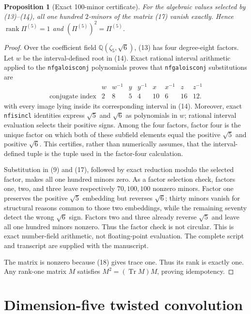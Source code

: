\documentclass[11pt]{article}
\newtheorem{proposition}[theorem]{Proposition}
\newcommand{\Tr}{\operatorname{Tr}}
\newcommand{\Q}{\mathbb Q}
\begin{document}
\begin{proposition}[Exact 100-minor certificate]\label{prop:minors}
For the algebraic values selected by (13)--(14), all one hundred
$2$-minors of the matrix (17) vanish exactly.  Hence
$\operatorname{rank}\Pi^{(5)}=1$ and
$(\Pi^{(5)})^2=\Pi^{(5)}$.
\end{proposition}

\begin{proof}
Over the coefficient field $\Q(\zeta_5,\sqrt6)$, (13) has four
degree-eight factors.  Let $w$ be the interval-defined root in (14).
Exact rational interval arithmetic applied to the
\texttt{nfgaloisconj} polynomials proves that
\texttt{nfgaloisconj} substitutions are
\[
\begin{array}{c|cccccccc}
 &w&w^{-1}&y&y^{-1}&x&x^{-1}&z&z^{-1}\\ \hline
\text{conjugate index}&2&8&5&4&10&6&16&12.
\end{array}
\tag{19}
\]
with every image lying inside its corresponding interval in (14).
Moreover, exact \texttt{nfisincl} identities express $\sqrt5$ and
$\sqrt6$ as polynomials in $w$; rational interval evaluation selects
their positive signs.  Among the four factors, factor four is the
unique factor on which both of these subfield elements equal the
positive $\sqrt5$ and positive $\sqrt6$.  This certifies, rather than
numerically assumes, that the interval-defined tuple is the tuple used
in the factor-four calculation.

Substitution in (9) and (17), followed by exact reduction modulo the
selected factor, makes all one hundred minors zero.  As a factor
selection check, factors one, two, and three leave respectively
$70,100,100$ nonzero minors.  Factor one preserves the positive
$\sqrt5$ embedding but reverses $\sqrt6$; thirty minors vanish for
structural reasons common to those two embeddings, while the remaining
seventy detect the wrong $\sqrt6$ sign.  Factors two and three already
reverse $\sqrt5$ and leave all one hundred minors nonzero.  Thus the
factor check is not circular.  This is exact number-field arithmetic,
not floating-point evaluation.  The complete script and transcript
are supplied with the manuscript.

The matrix is nonzero because (18) gives trace one.  Thus its rank is
exactly one.  Any rank-one matrix $M$ satisfies
$M^2=(\Tr M)M$, proving idempotency.
\end{proof}

\section{Dimension-five twisted convolution}
\end{document}
